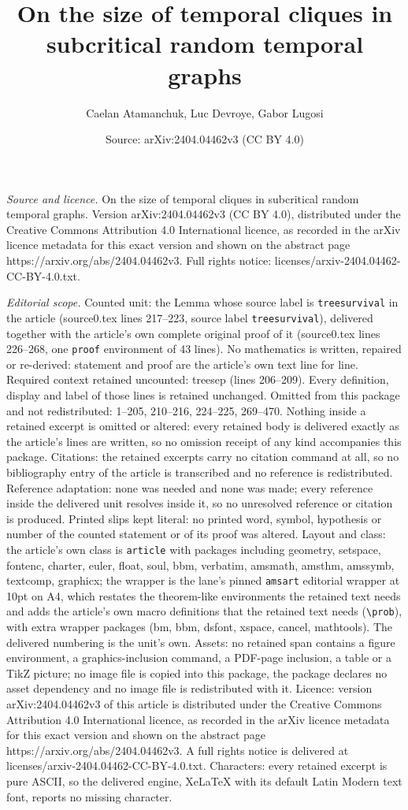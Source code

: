 \documentclass[10pt,a4paper]{amsart}
\title[On the size of temporal cliques in subcritical random tempor]{On the size of temporal cliques in subcritical random temporal graphs}
\author{Caelan Atamanchuk, Luc Devroye, Gabor Lugosi}
\date{Source: arXiv:2404.04462v3 (CC BY 4.0)}
\begin{document}
\maketitle

\noindent\emph{Source and licence.} On the size of temporal cliques in subcritical random temporal graphs. Version arXiv:2404.04462v3 (CC BY 4.0), distributed under the Creative Commons Attribution 4.0 International licence, as recorded in the arXiv licence metadata for this exact version and shown on the abstract page https://arxiv.org/abs/2404.04462v3. Full rights notice: licenses/arxiv-2404.04462-CC-BY-4.0.txt.\par\smallskip

\noindent\textit{Editorial scope.} Counted unit: the Lemma whose source label is \texttt{treesurvival} in the article (source0.tex lines 217--223, source label \texttt{treesurvival}), delivered together with the article's own complete original proof of it (source0.tex lines 226--268, one \texttt{proof} environment of 43 lines). No mathematics is written, repaired or re-derived: statement and proof are the article's own text line for line. Required context retained uncounted: treesep (lines 206--209). Every definition, display and label of those lines is retained unchanged. Omitted from this package and not redistributed: 1--205, 210--216, 224--225, 269--470. Nothing inside a retained excerpt is omitted or altered: every retained body is delivered exactly as the article's lines are written, so no omission receipt of any kind accompanies this package. Citations: the retained excerpts carry no citation command at all, so no bibliography entry of the article is transcribed and no reference is redistributed. Reference adaptation: none was needed and none was made; every reference inside the delivered unit resolves inside it, so no unresolved reference or citation is produced. Printed slips kept literal: no printed word, symbol, hypothesis or number of the counted statement or of its proof was altered. Layout and class: the article's own class is \texttt{article} with packages including geometry, setspace, fontenc, charter, euler, float, soul, bbm, verbatim, amsmath, amsthm, amssymb, textcomp, graphicx; the wrapper is the lane's pinned \texttt{amsart} editorial wrapper at 10pt on A4, which restates the theorem-like environments the retained text needs and adds the article's own macro definitions that the retained text needs (\texttt{\textbackslash prob}), with extra wrapper packages (bm, bbm, dsfont, xspace, cancel, mathtools). The delivered numbering is the unit's own. Assets: no retained span contains a figure environment, a graphics-inclusion command, a PDF-page inclusion, a table or a TikZ picture; no image file is copied into this package, the package declares no asset dependency and no image file is redistributed with it. Licence: version arXiv:2404.04462v3 of this article is distributed under the Creative Commons Attribution 4.0 International licence, as recorded in the arXiv licence metadata for this exact version and shown on the abstract page https://arxiv.org/abs/2404.04462v3. A full rights notice is delivered at licenses/arxiv-2404.04462-CC-BY-4.0.txt. Characters: every retained excerpt is pure ASCII, so the delivered engine, XeLaTeX with its default Latin Modern text font, reports no missing character.
\end{document}
